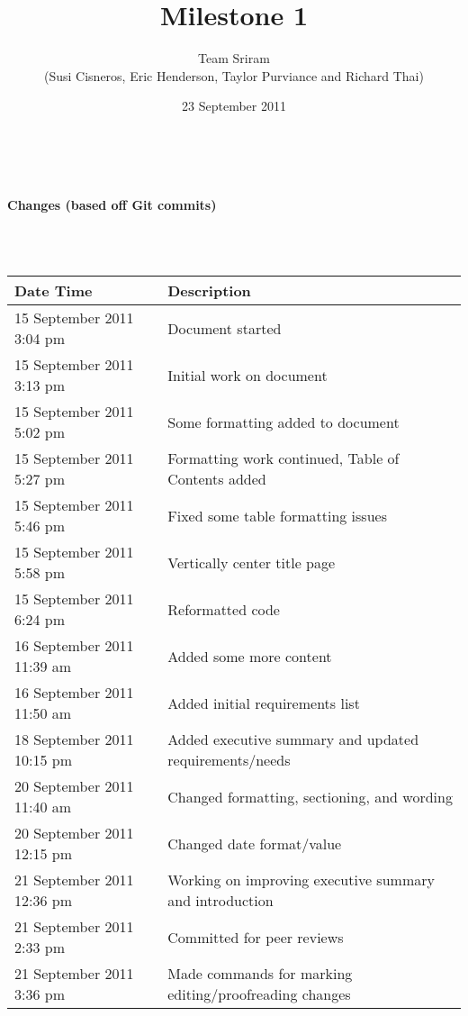\documentclass{article}
\begin{document}
\setlength{\voffset}{3.5in}
\title{Milestone 1}
\author{Team Sriram\\
(Susi Cisneros, Eric Henderson, Taylor Purviance and Richard Thai)}
\date{23 September 2011}
\maketitle
\clearpage
\setlength{\voffset}{0pt}
\tableofcontents
\clearpage
~\\
\begin{Large}\textbf{Changes (based off Git commits)}\end{Large}\\
~\\
\begin{tabular}{ | p{2in} | p{4.5in} | }
\hline
\textbf{Date Time} & \textbf{Description}\\
\hline
\hline
15 September 2011  3:04 pm & Document started\\
\hline
15 September 2011  3:13 pm & Initial work on document\\
\hline
15 September 2011  5:02 pm & Some formatting added to document \\
\hline
15 September 2011  5:27 pm & Formatting work continued, Table of Contents added \\
\hline
15 September 2011  5:46 pm & Fixed some table formatting issues \\
\hline
15 September 2011  5:58 pm & Vertically center title page \\
\hline
15 September 2011  6:24 pm & Reformatted code \\
\hline
16 September 2011  11:39 am & Added some more content \\
\hline
16 September 2011  11:50 am & Added initial requirements list \\
\hline
18 September 2011  10:15 pm & Added executive summary and updated requirements/needs\\
\hline
20 September 2011  11:40 am & Changed formatting, sectioning, and wording \\
\hline
20 September 2011  12:15 pm & Changed date format/value \\
\hline
21 September 2011  12:36 pm & Working on improving executive summary and introduction\\
\hline
21 September 2011  2:33 pm & Committed for peer reviews \\
\hline
21 September 2011  3:36 pm & Made commands for marking editing/proofreading changes \\

\end{tabular}
\end{document}
